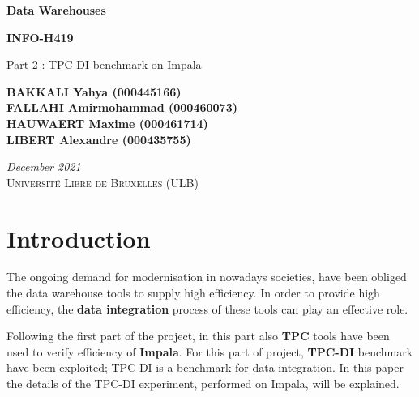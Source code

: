 \documentclass{article}
\newcommand\bld[1]{\textbf{#1}}
\begin{document}
\begin{titlepage}
    \begin{center}
        \BgThispage
        \vspace*{1cm}
        
        
        \huge
        \textbf{Data Warehouses}
        \vspace{0.25cm}
        
        \LARGE
        \textbf{INFO-H419}
        
        \vspace{0.5cm}
        \LARGE
        {Part 2 : TPC-DI benchmark on Impala}
        
        
        \vspace{3.5cm}
        
        \textbf{BAKKALI Yahya (000445166) \\}
        \textbf{FALLAHI Amirmohammad (000460073) \\}
        \textbf{HAUWAERT Maxime (000461714) \\}
        \textbf{LIBERT Alexandre (000435755) \\}
    
        \vspace{2.5cm}
        \textit{December 2021 \\}
        \vspace{0.5cm}
        \textsc{Université Libre de Bruxelles (ULB)}
        
        
    \end{center}
\end{titlepage}

\tableofcontents
\newpage
\setlength{\parskip}{1em}

\section{Introduction}

The ongoing demand for modernisation in nowadays societies, have been obliged the data warehouse tools to supply high efficiency. In order to provide high efficiency, the \bld{data integration} process of these tools can play an effective role.

Following the first part of the project, in this part also \bld{TPC} tools have been used to verify efficiency of \bld{Impala}. For this part of project, \bld{TPC-DI} benchmark have been exploited; TPC-DI is a benchmark for data integration. In this paper the details of the TPC-DI experiment, performed on Impala, will be explained.
\end{document}
